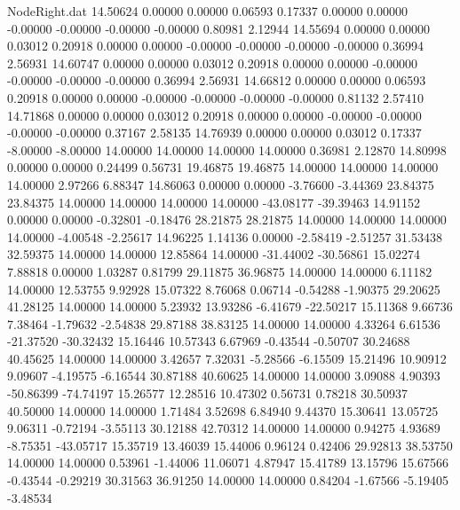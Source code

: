 \begin{filecontents}{NodeRight.dat}
  14.50624    0.00000    0.00000     0.06593    0.17337    0.00000    0.00000   -0.00000   -0.00000   -0.00000   -0.00000    0.80981    2.12944
  14.55694    0.00000    0.00000     0.03012    0.20918    0.00000    0.00000   -0.00000   -0.00000   -0.00000   -0.00000    0.36994    2.56931
  14.60747    0.00000    0.00000     0.03012    0.20918    0.00000    0.00000   -0.00000   -0.00000   -0.00000   -0.00000    0.36994    2.56931
  14.66812    0.00000    0.00000     0.06593    0.20918    0.00000    0.00000   -0.00000   -0.00000   -0.00000   -0.00000    0.81132    2.57410
  14.71868    0.00000    0.00000     0.03012    0.20918    0.00000    0.00000   -0.00000   -0.00000   -0.00000   -0.00000    0.37167    2.58135
  14.76939    0.00000    0.00000     0.03012    0.17337   -8.00000   -8.00000   14.00000   14.00000   14.00000   14.00000    0.36981    2.12870
  14.80998    0.00000    0.00000     0.24499    0.56731   19.46875   19.46875   14.00000   14.00000   14.00000   14.00000    2.97266    6.88347
  14.86063    0.00000    0.00000    -3.76600   -3.44369   23.84375   23.84375   14.00000   14.00000   14.00000   14.00000  -43.08177  -39.39463
  14.91152    0.00000    0.00000    -0.32801   -0.18476   28.21875   28.21875   14.00000   14.00000   14.00000   14.00000   -4.00548   -2.25617
  14.96225    1.14136    0.00000    -2.58419   -2.51257   31.53438   32.59375   14.00000   14.00000   12.85864   14.00000  -31.44002  -30.56861
  15.02274    7.88818    0.00000     1.03287    0.81799   29.11875   36.96875   14.00000   14.00000    6.11182   14.00000   12.53755    9.92928
  15.07322    8.76068    0.06714    -0.54288   -1.90375   29.20625   41.28125   14.00000   14.00000    5.23932   13.93286   -6.41679  -22.50217
  15.11368    9.66736    7.38464    -1.79632   -2.54838   29.87188   38.83125   14.00000   14.00000    4.33264    6.61536  -21.37520  -30.32432
  15.16446   10.57343    6.67969    -0.43544   -0.50707   30.24688   40.45625   14.00000   14.00000    3.42657    7.32031   -5.28566   -6.15509
  15.21496   10.90912    9.09607    -4.19575   -6.16544   30.87188   40.60625   14.00000   14.00000    3.09088    4.90393  -50.86399  -74.74197
  15.26577   12.28516   10.47302     0.56731    0.78218   30.50937   40.50000   14.00000   14.00000    1.71484    3.52698    6.84940    9.44370
  15.30641   13.05725    9.06311    -0.72194   -3.55113   30.12188   42.70312   14.00000   14.00000    0.94275    4.93689   -8.75351  -43.05717
  15.35719   13.46039   15.44006     0.96124    0.42406   29.92813   38.53750   14.00000   14.00000    0.53961   -1.44006   11.06071    4.87947
  15.41789   13.15796   15.67566    -0.43544   -0.29219   30.31563   36.91250   14.00000   14.00000    0.84204   -1.67566   -5.19405   -3.48534

\end{filecontents}
